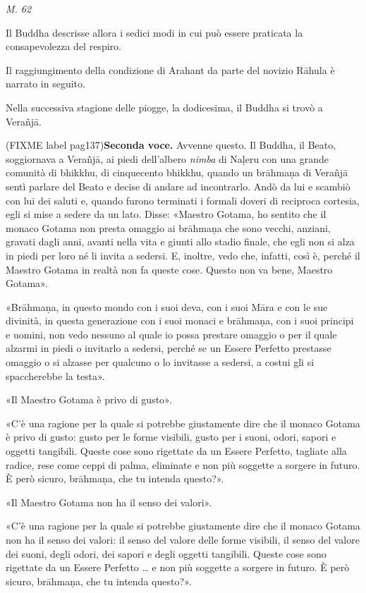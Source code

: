 \emph{M. 62}


 Il Buddha descrisse allora i sedici modi in cui può
essere praticata la consapevolezza del respiro.


 Il raggiungimento della condizione di Arahant da parte
del novizio Rāhula è narrato in seguito.


 Nella successiva stagione delle piogge, la
dodicesima, il Buddha si trovò a Verañjā.


(FIXME label pag137)\textbf{Seconda voce.} Avvenne questo. Il Buddha, il Beato, soggiornava a
Verañjā, ai piedi dell’albero \emph{nimba} di Naḷeru con una grande comunità
di bhikkhu, di cinquecento bhikkhu, quando un brāhmaṇa di Verañjā sentì
parlare del Beato e decise di andare ad incontrarlo. Andò da lui e
scambiò con lui dei saluti e, quando furono terminati i formali doveri
di reciproca cortesia, egli si mise a sedere da un lato. Disse: «Maestro
Gotama, ho sentito che il monaco Gotama non presta omaggio ai brāhmaṇa
che sono vecchi, anziani, gravati dagli anni, avanti nella vita e giunti
allo stadio finale, che egli non si alza in piedi per loro né li invita
a sedersi. E, inoltre, vedo che, infatti, così è, perché il Maestro
Gotama in realtà non fa queste cose. Questo non va bene, Maestro
Gotama».


«Brāhmaṇa, in questo mondo con i suoi deva, con i suoi Māra e con le sue
divinità, in questa generazione con i suoi monaci e brāhmaṇa, con i suoi
principi e uomini, non vedo nessuno al quale io possa prestare omaggio o
per il quale alzarmi in piedi o invitarlo a sedersi, perché se un Essere
Perfetto prestasse omaggio o si alzasse per qualcuno o lo invitasse a
sedersi, a costui gli si spaccherebbe la testa».


«Il Maestro Gotama è privo di gusto».


«C’è una ragione per la quale si potrebbe giustamente dire che il monaco
Gotama è privo di gusto: gusto per le forme visibili, gusto per i suoni,
odori, sapori e oggetti tangibili. Queste cose sono rigettate da un
Essere Perfetto, tagliate alla radice, rese come ceppi di palma,
eliminate e non più soggette a sorgere in futuro. È però sicuro,
brāhmaṇa, che tu intenda questo?».


«Il Maestro Gotama non ha il senso dei valori».


«C’è una ragione per la quale si potrebbe giustamente dire che il monaco
Gotama non ha il senso dei valori: il senso del valore delle forme
visibili, il senso del valore dei suoni, degli odori, dei sapori e degli
oggetti tangibili. Queste cose sono rigettate da un Essere Perfetto … e
non più soggette a sorgere in futuro. È però sicuro, brāhmaṇa, che tu
intenda questo?».


